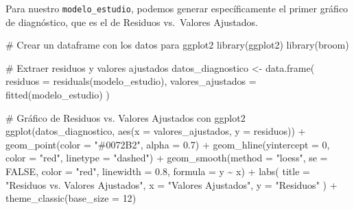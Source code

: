 \documentclass[
  letterpaper,
  DIV=11,
  numbers=noendperiod]{scrreprt}
\newenvironment{Shaded}{\begin{snugshade}}{\end{snugshade}}
\newcommand{\AttributeTok}[1]{\textcolor[rgb]{0.40,0.45,0.13}{#1}}
\newcommand{\CommentTok}[1]{\textcolor[rgb]{0.37,0.37,0.37}{#1}}
\newcommand{\ConstantTok}[1]{\textcolor[rgb]{0.56,0.35,0.01}{#1}}
\newcommand{\DecValTok}[1]{\textcolor[rgb]{0.68,0.00,0.00}{#1}}
\newcommand{\FloatTok}[1]{\textcolor[rgb]{0.68,0.00,0.00}{#1}}
\newcommand{\FunctionTok}[1]{\textcolor[rgb]{0.28,0.35,0.67}{#1}}
\newcommand{\NormalTok}[1]{\textcolor[rgb]{0.00,0.23,0.31}{#1}}
\newcommand{\OtherTok}[1]{\textcolor[rgb]{0.00,0.23,0.31}{#1}}
\newcommand{\SpecialCharTok}[1]{\textcolor[rgb]{0.37,0.37,0.37}{#1}}
\newcommand{\StringTok}[1]{\textcolor[rgb]{0.13,0.47,0.30}{#1}}
\begin{document}
\begin{tcolorbox}[enhanced jigsaw, leftrule=.75mm, breakable, colbacktitle=quarto-callout-tip-color!10!white, bottomrule=.15mm, colframe=quarto-callout-tip-color-frame, toprule=.15mm, colback=white, coltitle=black, bottomtitle=1mm, left=2mm, title=\textcolor{quarto-callout-tip-color}{\faLightbulb}\hspace{0.5em}{Ejemplo de un modelo válido}, opacityback=0, arc=.35mm, opacitybacktitle=0.6, toptitle=1mm, titlerule=0mm, rightrule=.15mm]

Para nuestro \texttt{modelo\_estudio}, podemos generar específicamente
el primer gráfico de diagnóstico, que es el de Residuos vs.~Valores
Ajustados.

\begin{Shaded}
\begin{Highlighting}[]
\CommentTok{\# Crear un dataframe con los datos para ggplot2}
\FunctionTok{library}\NormalTok{(ggplot2)}
\FunctionTok{library}\NormalTok{(broom)}

\CommentTok{\# Extraer residuos y valores ajustados}
\NormalTok{datos\_diagnostico }\OtherTok{\textless{}{-}} \FunctionTok{data.frame}\NormalTok{(}
  \AttributeTok{residuos =} \FunctionTok{residuals}\NormalTok{(modelo\_estudio),}
  \AttributeTok{valores\_ajustados =} \FunctionTok{fitted}\NormalTok{(modelo\_estudio)}
\NormalTok{)}

\CommentTok{\# Gráfico de Residuos vs. Valores Ajustados con ggplot2}
\FunctionTok{ggplot}\NormalTok{(datos\_diagnostico, }\FunctionTok{aes}\NormalTok{(}\AttributeTok{x =}\NormalTok{ valores\_ajustados, }\AttributeTok{y =}\NormalTok{ residuos)) }\SpecialCharTok{+}
  \FunctionTok{geom\_point}\NormalTok{(}\AttributeTok{color =} \StringTok{"\#0072B2"}\NormalTok{, }\AttributeTok{alpha =} \FloatTok{0.7}\NormalTok{) }\SpecialCharTok{+}
  \FunctionTok{geom\_hline}\NormalTok{(}\AttributeTok{yintercept =} \DecValTok{0}\NormalTok{, }\AttributeTok{color =} \StringTok{"red"}\NormalTok{, }\AttributeTok{linetype =} \StringTok{"dashed"}\NormalTok{) }\SpecialCharTok{+}
  \FunctionTok{geom\_smooth}\NormalTok{(}\AttributeTok{method =} \StringTok{"loess"}\NormalTok{, }\AttributeTok{se =} \ConstantTok{FALSE}\NormalTok{, }\AttributeTok{color =} \StringTok{"red"}\NormalTok{, }\AttributeTok{linewidth =} \FloatTok{0.8}\NormalTok{, }\AttributeTok{formula =}\NormalTok{ y }\SpecialCharTok{\textasciitilde{}}\NormalTok{ x) }\SpecialCharTok{+}
  \FunctionTok{labs}\NormalTok{(}
    \AttributeTok{title =} \StringTok{"Residuos vs. Valores Ajustados"}\NormalTok{,}
    \AttributeTok{x =} \StringTok{"Valores Ajustados"}\NormalTok{,}
    \AttributeTok{y =} \StringTok{"Residuos"}
\NormalTok{  ) }\SpecialCharTok{+}
  \FunctionTok{theme\_classic}\NormalTok{(}\AttributeTok{base\_size =} \DecValTok{12}\NormalTok{)}
\end{Highlighting}
\end{Shaded}


\end{tcolorbox}
\end{document}
